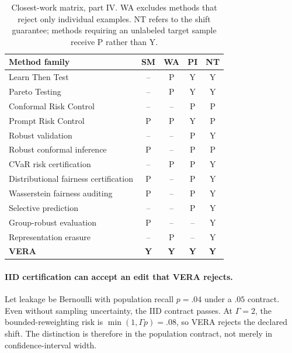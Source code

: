\begin{table}[t]
\centering\scriptsize
\begin{tabular}{@{}lcccc@{}}
\toprule
Method family & SM & WA & PI & NT \\
\midrule
Learn Then Test \cite{angelopoulos2025ltt} & -- & P & Y & Y \\
Pareto Testing \cite{laufer2023pareto} & -- & P & Y & Y \\
Conformal Risk Control \cite{angelopoulos2024crc} & -- & -- & P & P \\
Prompt Risk Control \cite{zollo2024prompt} & P & P & Y & P \\
Robust validation \cite{cauchois2024robust} & -- & -- & P & Y \\
Robust conformal inference \cite{ai2024finegrained} & P & -- & P & P \\
CVaR risk certification \cite{thomas2019cvar} & -- & P & P & Y \\
Distributional fairness certification \cite{kang2022certifying} & P & -- & P & Y \\
Wasserstein fairness auditing \cite{ehyaei2025fragile} & P & -- & P & Y \\
Selective prediction \cite{elyaniv2010foundations,geifman2019selectivenet} & -- & -- & P & Y \\
Group-robust evaluation \cite{sagawa2020groupdro,koh2021wilds} & P & -- & -- & Y \\
Representation erasure \cite{ravfogel2020null,ravfogel2022linear,belrose2023leace} & -- & P & -- & Y \\
\textbf{VERA} & \textbf{Y} & \textbf{Y} & \textbf{Y} & \textbf{Y} \\
\bottomrule
\end{tabular}
\caption{Closest-work matrix, part IV. WA excludes methods that reject only
individual examples. NT refers to the shift guarantee; methods requiring an
unlabeled target sample receive P rather than Y.}
\label{tab:novelty-d}
\end{table}

\paragraph{IID certification can accept an edit that VERA rejects.}
Let leakage be Bernoulli with population recall $p=.04$ under a $.05$
contract. Even without sampling uncertainty, the IID contract passes. At
$\Gamma=2$, the bounded-reweighting risk is
$\min(1,\Gamma p)=.08$, so VERA rejects the declared shift. The distinction is
therefore in the population contract, not merely in confidence-interval width.


